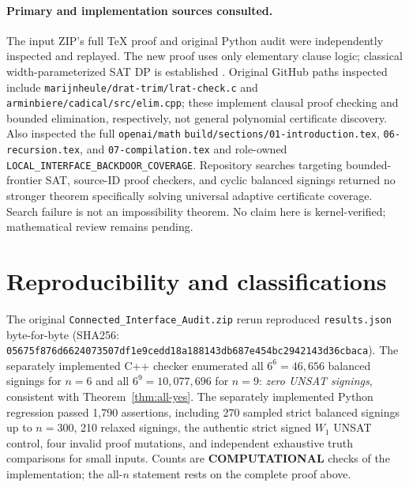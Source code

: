 \documentclass[11pt]{article}
\begin{document}
\paragraph{Primary and implementation sources consulted.}
The input ZIP's full TeX proof and original Python audit were independently inspected and replayed. The new proof uses only elementary clause logic; classical width-parameterized SAT DP is established \cite{allender,samer}. Original GitHub paths inspected include \texttt{marijnheule/drat-trim/lrat-check.c} and \texttt{arminbiere/cadical/src/elim.cpp}; these implement clausal proof checking and bounded elimination, respectively, not general polynomial certificate discovery. Also inspected the full \texttt{openai/math} \texttt{build/sections/01-introduction.tex}, \texttt{06-recursion.tex}, and \texttt{07-compilation.tex} and role-owned \texttt{LOCAL\_INTERFACE\_BACKDOOR\_COVERAGE}. Repository searches targeting bounded-frontier SAT, source-ID proof checkers, and cyclic balanced signings returned no stronger theorem specifically solving universal adaptive certificate coverage. Search failure is not an impossibility theorem. No claim here is kernel-verified; mathematical review remains pending.

\section{Reproducibility and classifications}
The original \texttt{Connected\_Interface\_Audit.zip} rerun reproduced \texttt{results.json} byte-for-byte (SHA256: \texttt{05675f876d6624073507df1e9cedd18a188143db687e454bc2942143d36cbaca}). The separately implemented C++ checker enumerated all $6^6=46,656$ balanced signings for $n=6$ and all $6^9=10,077,696$ for $n=9$: \emph{zero UNSAT signings}, consistent with Theorem~\ref{thm:all-yes}. The separately implemented Python regression passed 1,790 assertions, including 270 sampled strict balanced signings up to $n=300$, 210 relaxed signings, the authentic strict signed $W_1$ UNSAT control, four invalid proof mutations, and independent exhaustive truth comparisons for small inputs. Counts are \textbf{COMPUTATIONAL} checks of the implementation; the all-$n$ statement rests on the complete proof above.
\end{document}
